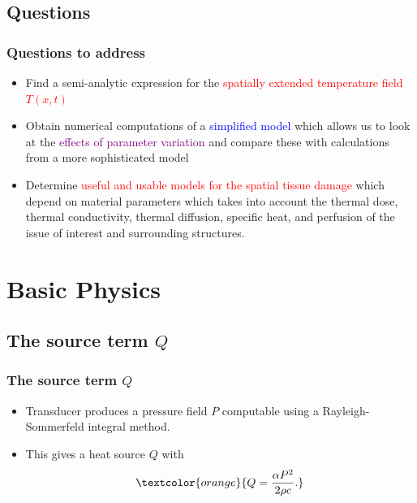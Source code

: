 \documentclass{beamer}
\begin{document}
\subsection{Questions}
\begin{frame}
\frametitle{Questions to address}
\begin{itemize}
\item Find a semi-analytic expression for the \textcolor{red}{spatially extended temperature field $T(x,t)$}
\item Obtain numerical computations of a \textcolor{blue}{simplified model} which allows us to look at the \textcolor{purple}{effects of parameter variation} and compare these with calculations from a more sophisticated model
\item Determine \textcolor{red}{useful and usable models for the spatial  tissue damage} which depend on material parameters which  takes
into
account
the
thermal
dose,
thermal
conductivity,
thermal
diffusion,
specific
heat,
and
perfusion
of
the
issue
of
interest
and
surrounding
structures.
\end{itemize}
\end{frame}



\section{Basic Physics}
\subsection{The source term $Q$}
\begin{frame}
\frametitle{The source term $Q$}

\begin{itemize}

\item Transducer produces a pressure field $P$ computable using a Rayleigh-Sommerfeld integral method.

\item This gives a heat source $Q$ with
$$\textcolor{orange} {Q = \frac{ \alpha P^2}{2 \rho c}.}$$
\end{itemize}

\end{frame}
\end{document}
